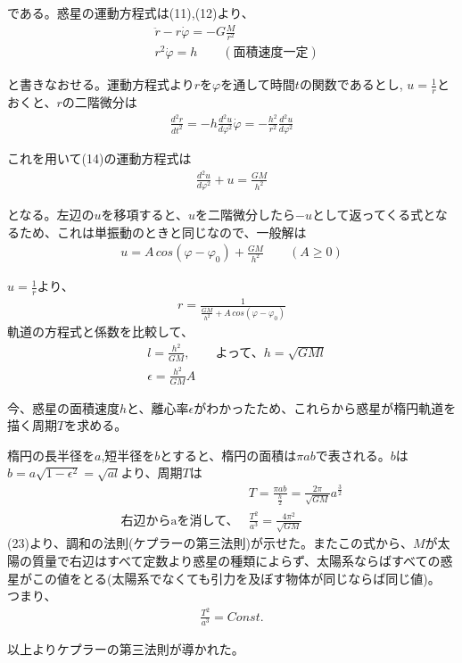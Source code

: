 \documentclass{jsarticle}
\begin{document}
である。惑星の運動方程式は(11),(12)より、
  \begin{align}
    &\ddot{r}-r\dot{\varphi}=-G\frac{M}{r^2} \\
    &r^2\dot{\varphi}=h \qquad(\text{面積速度一定})
  \end{align}

と書きなおせる。運動方程式より$r$を$\varphi$を通して時間$t$の関数であるとし,
$u=\frac{1}{r}$とおくと、$r$の二階微分は
  \begin{align}
    \frac{d^2r}{dt^2}=-h\frac{d^2u}{d\varphi^2}\dot{\varphi}=-\frac{h^2}{r^2}\frac{d^2u}{d\varphi^2} 
  \end{align}

これを用いて(14)の運動方程式は
  \begin{align}
    \frac{d^2u}{d\varphi^2}+u=\frac{GM}{h^2}
  \end{align}

となる。左辺の$u$を移項すると、$u$を二階微分したら$-u$として返ってくる式となるため、これは単振動のときと同じなので、一般解は
  \begin{align}
    u=A\,cos(\varphi-\varphi_0)+\frac{GM}{h^2} \qquad(A\geq 0)
  \end{align}

$u=\frac{1}{r}$より、
  \begin{align}
    r=\frac{1}{\frac{GM}{h^2}+A\,cos(\varphi-\varphi_0)}
  \end{align}
軌道の方程式と係数を比較して、
  \begin{align}
    &l=\frac{h^2}{GM},\qquad \text{よって、}h=\sqrt{GMl} \\
    &\epsilon=\frac{h^2}{GM}A 
  \end{align}

今、惑星の面積速度$h$と、離心率$\epsilon$がわかったため、これらから惑星が楕円軌道を描く周期$T$を求める。

\leavevmode 楕円の長半径を$a$,短半径を$b$とすると、楕円の面積は$\pi ab$で表される。$b$は$b=a\sqrt{1-\epsilon^2}=\sqrt{al}$より、周期$T$は
  \begin{align}
    &T=\frac{\pi ab}{\frac{h}{2}}=\frac{2\pi}{\sqrt{GM}}a^\frac{3}{2} \\
    \text{右辺からaを消して、}&\frac{T^2}{a^3}=\frac{4\pi^2}{\sqrt{GM}}
  \end{align}
(23)より、調和の法則(ケプラーの第三法則)が示せた。またこの式から、$M$が太陽の質量で右辺はすべて定数より惑星の種類によらず、太陽系ならばすべての惑星がこの値をとる(太陽系でなくても引力を及ぼす物体が同じならば同じ値)。
つまり、
  \begin{align}
    \frac{T^2}{a^3}=Const.
  \end{align}

  以上よりケプラーの第三法則が導かれた。
\end{document}
